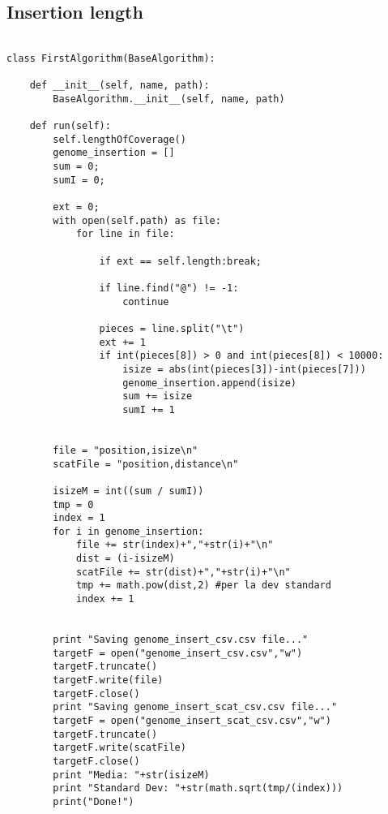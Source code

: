\subsection{Insertion length}
\tiny
\begin{verbatim}

class FirstAlgorithm(BaseAlgorithm):

    def __init__(self, name, path):
        BaseAlgorithm.__init__(self, name, path)

    def run(self):
        self.lengthOfCoverage()
        genome_insertion = []
        sum = 0;
        sumI = 0;

        ext = 0;
        with open(self.path) as file:
            for line in file:

                if ext == self.length:break;

                if line.find("@") != -1:
                    continue

                pieces = line.split("\t")
                ext += 1
                if int(pieces[8]) > 0 and int(pieces[8]) < 10000:
                    isize = abs(int(pieces[3])-int(pieces[7]))
                    genome_insertion.append(isize)
                    sum += isize
                    sumI += 1


        file = "position,isize\n"
        scatFile = "position,distance\n"

        isizeM = int((sum / sumI))
        tmp = 0
        index = 1
        for i in genome_insertion:
            file += str(index)+","+str(i)+"\n"
            dist = (i-isizeM)
            scatFile += str(dist)+","+str(i)+"\n"
            tmp += math.pow(dist,2) #per la dev standard
            index += 1


        print "Saving genome_insert_csv.csv file..."
        targetF = open("genome_insert_csv.csv","w")
        targetF.truncate()
        targetF.write(file)
        targetF.close()
        print "Saving genome_insert_scat_csv.csv file..."
        targetF = open("genome_insert_scat_csv.csv","w")
        targetF.truncate()
        targetF.write(scatFile)
        targetF.close()
        print "Media: "+str(isizeM)
        print "Standard Dev: "+str(math.sqrt(tmp/(index)))
        print("Done!")

\end{verbatim}

